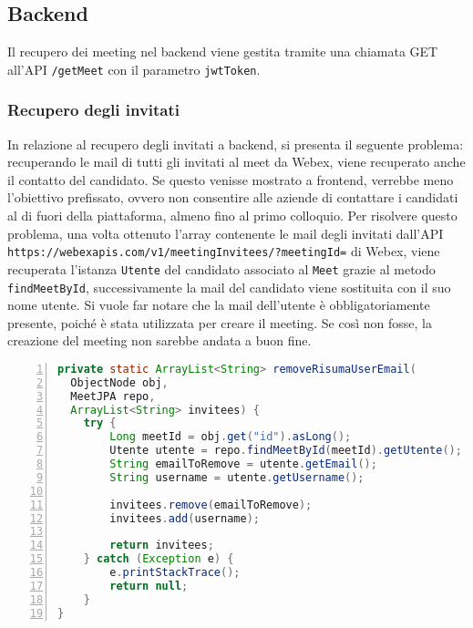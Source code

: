 \subsection{Backend}
Il recupero dei meeting nel backend viene gestita tramite una chiamata 
GET all'API \texttt{\//getMeet} con il parametro \texttt{jwtToken}.

\clearpage


\subsubsection{Recupero degli invitati}
\label{sec:recupero_invitati_backend}
In relazione al recupero degli invitati a backend, si presenta il seguente problema: recuperando le mail di tutti
gli invitati al meet da Webex, viene recuperato anche il contatto del candidato. Se questo venisse mostrato 
a frontend, verrebbe meno l'obiettivo prefissato, ovvero non consentire alle aziende di contattare i candidati
al di fuori della piattaforma, almeno fino al primo colloquio. Per risolvere questo problema, una volta 
ottenuto l'array contenente le mail degli invitati dall'API \texttt{https://webexapis.com/v1/meetingInvitees/?meetingId=} di Webex, 
viene recuperata l'istanza \texttt{Utente} del candidato associato al \texttt{Meet} grazie al metodo \texttt{findMeetById}, 
successivamente la mail del candidato viene sostituita con il suo nome utente.
Si vuole far notare che la mail dell'utente è obbligatoriamente presente, poiché è stata utilizzata per creare il meeting.
Se così non fosse, la creazione del meeting non sarebbe andata a buon fine.
\begin{lstlisting}[language=java, frame=lines, basicstyle=\ttfamily\scriptsize, numbers=left]
private static ArrayList<String> removeRisumaUserEmail(
  ObjectNode obj, 
  MeetJPA repo, 
  ArrayList<String> invitees) {
	try {
		Long meetId = obj.get("id").asLong();
		Utente utente = repo.findMeetById(meetId).getUtente();
		String emailToRemove = utente.getEmail();
		String username = utente.getUsername();
		
		invitees.remove(emailToRemove);
		invitees.add(username);
			
		return invitees;
	} catch (Exception e) {
		e.printStackTrace();
		return null;
	}
}
\end{lstlisting}
